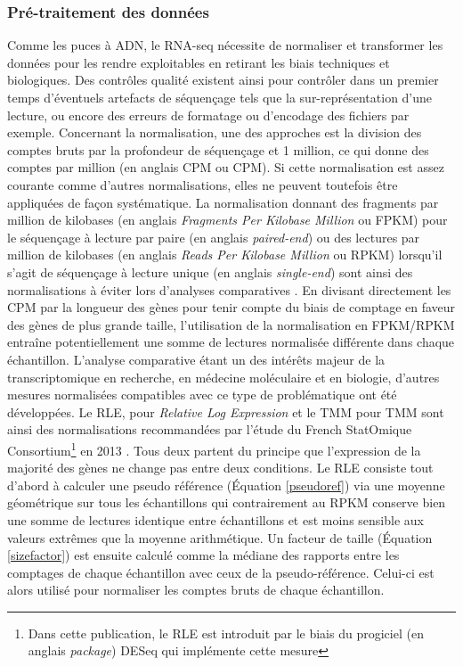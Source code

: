 \subsubsection{Pré-traitement des données}

Comme les puces à \acrshort{ADN}, le \acrshort{RNA-seq} nécessite de normaliser et transformer les données pour les rendre exploitables en retirant les biais techniques et biologiques. Des contrôles qualité existent ainsi pour contrôler dans un premier temps d'éventuels artefacts de séquençage tels que la sur-représentation d'une lecture, ou encore des erreurs de formatage ou d'encodage des fichiers par exemple. Concernant la normalisation, une des approches est la division des comptes bruts par la profondeur de séquençage et 1 million, ce qui donne des comptes par million (en anglais \acrlong{CPM} ou \acrshort{CPM}). Si cette normalisation est assez courante comme d'autres normalisations, elles ne peuvent toutefois être appliquées de façon systématique. La normalisation donnant des fragments par million de kilobases (en anglais \textit{Fragments Per Kilobase Million} ou \acrshort{FPKM}) pour le séquençage à lecture par paire (en anglais \textit{paired-end}) ou des lectures par million de kilobases (en anglais \textit{Reads Per Kilobase Million} ou \acrshort{RPKM}) lorsqu'il s'agit de séquençage à lecture unique (en anglais \textit{single-end}) sont ainsi des normalisations à éviter lors d'analyses comparatives \cite{Wagner2012Dec}. En divisant directement les \acrshort{CPM} par la longueur des gènes pour tenir compte du biais de comptage en faveur des gènes de plus grande taille, l'utilisation de la normalisation en \acrshort{FPKM}/\acrshort{RPKM} entraîne potentiellement une somme de lectures normalisée différente dans chaque échantillon. L'analyse comparative étant un des intérêts majeur de la \gls{transcriptomique} en recherche, en médecine moléculaire et en biologie, d'autres mesures normalisées compatibles avec ce type de problématique ont été développées. Le \acrshort{RLE}, pour \textit{Relative Log Expression} \cite{Anders2010Oct} et le \acrshort{TMM} pour \acrlong{TMM} \cite{Robinson2010Mar} sont ainsi des normalisations recommandées par l'étude du French StatOmique Consortium\footnote{Dans cette publication, le \acrshort{RLE} est introduit par le biais du progiciel (en anglais \textit{package}) DESeq \cite{Anders2010Oct} qui implémente cette mesure} en 2013 \cite{Dillies2013Nov}. Tous deux partent du principe que l'expression de la majorité des gènes ne change pas entre deux \glspl{condition}. Le \acrshort{RLE} consiste tout d'abord à calculer une pseudo référence (Équation \ref{pseudoref}) via une moyenne géométrique sur tous les échantillons \cite{Gandolfo2018Feb} qui contrairement au \acrshort{RPKM} conserve bien une somme de lectures identique entre échantillons et est moins sensible aux valeurs extrêmes que la moyenne arithmétique. Un facteur de taille (Équation \ref{sizefactor}) est ensuite calculé comme la médiane des rapports entre les comptages de chaque échantillon avec ceux de la pseudo-référence. Celui-ci est alors utilisé pour normaliser les comptes bruts de chaque échantillon.
